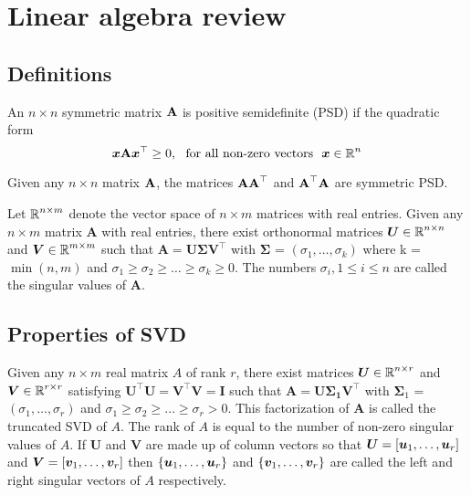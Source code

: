 \section{Linear algebra review}\label{SVD}
\subsection{Definitions}


\begin{Def}
An $n\times n$ symmetric matrix $\textbf{A}$ is positive semidefinite (PSD) if the quadratic form
\[
\vect{x} \Bm{A} \vect{x}^{\top} \geq 0,\ \ \text{for all non-zero vectors} \ \ \vect{x} \in \R^{n}
\]

Given any $n\times n$ matrix $\textbf{A}$, the matrices $\textbf{A}\textbf{A}^{\top}$
and $\textbf{A}^{\top}\textbf{A}$ are symmetric PSD.

\end{Def}

\begin{Def}
Let $\operatorname{\mathbb{R}}^{n \times m}$ denote the vector space of $n \times m$ matrices with real entries. Given any $n\times m$ matrix $\bm{A}$ with real entries, there exist orthonormal matrices $\bm{U} \in \operatorname{\mathbb{R}}^{n \times n}$ and $\bm{V} \in \operatorname{\mathbb{R}}^{m \times m}$ such that 
$\bm{\displaystyle A = U \Sigma V^{\top}}$ with $\bm{\Sigma}$ = $(\sigma_{1}, \ldots, \sigma_{k})$ where  k = $\min(n, m)$ and
 $\sigma_{1} \geq \sigma_{2} \geq \ldots \geq \sigma_{k} \geq 0$.
The numbers $\sigma_{i}, 1\leq i\leq n$ are called the singular values of $\bm{A}$. 
\end{Def}


\subsection{Properties of SVD}
Given any $n\times m$ real matrix $A$ of rank $r$, there exist matrices  $\bm{U} \in \operatorname{\mathbb{R}}^{n \times r}$ and $\bm{V} \in \operatorname{\mathbb{R}}^{r \times r}$ satisfying $\bm{U^{\top}U = V^{\top}V = I}$ such that $\bm{\text{A} = \text{U} \Sigma_{1} \text{V}^{\top}}$ with $\bm{\Sigma}_{1}$ = $(\sigma_{1}, \ldots, \sigma_{r})$ and $\sigma_{1} \geq \sigma_{2} \geq \ldots \geq \sigma_{r} > 0$.
This factorization of $\bm{A}$ is called the truncated SVD of $A$.
The rank of $A$ is equal to the number of non-zero singular values of $A$.
If $\bm{U}$ and $\bm{V}$ are made up of column vectors so that  $\bm{U} = [\boldsymbol{u}_1, \ldots, \boldsymbol{u}_{r}]$ and $\bm{V} = [\boldsymbol{v}_{1}, \ldots, \boldsymbol{v}_{r}]$ then $\{ \boldsymbol{u}_1, \ldots, \boldsymbol{u}_{r} \}$  and $\{\boldsymbol{v}_{1}, \ldots, \boldsymbol{v}_{r} \}$ are called the left and right singular vectors of $A$ respectively. 


